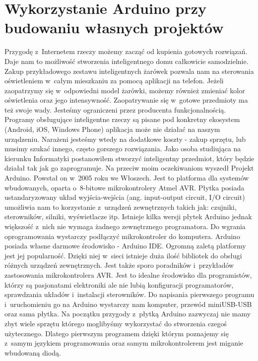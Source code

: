 \documentclass{xmgr}
\begin{document}
\section{Wykorzystanie Arduino przy budowaniu własnych projektów}

	Przygodę z~Internetem rzeczy możemy zacząć od kupienia gotowych rozwiązań. Daje nam to możliwość stworzenia inteligentnego domu całkowicie samodzielnie. Zakup przykładowego zestawu inteligentnych żarówek pozwala nam na sterowania oświetleniem w~całym mieszkaniu za pomocą aplikacji na telefon. Jeżeli zaopatrzymy się w~odpowiedni model żarówki, możemy również zmieniać kolor oświetlenia oraz jego intensywność. 
	Zaopatrywanie się w~gotowe przedmioty ma też swoje wady. Jesteśmy ograniczeni przez producenta funkcjonalnością. Programy obsługujące inteligentne rzeczy są pisane pod konkretny ekosystem (Android, iOS, Windows Phone) aplikacja może nie działać na naszym urządzeniu. Narażeni jesteśmy wtedy na dodatkowe koszty - zakup sprzętu, lub musimy szukać innego, często gorszego rozwiązania. Jako osoba studiująca na kierunku Informatyki postanowiłem stworzyć inteligentny przedmiot, który będzie działał tak jak go zaprogramuje. 
	Na przeciw moim oczekiwaniom wyszedł Projekt Arduino. Powstał on w~2005 roku we Włoszech. Jest to platforma dla systemów wbudowanych, oparta o~8-bitowe mikrokontrolery Atmel AVR. Płytka posiada ustandaryzowany układ wyjścia-wejścia (ang. input-output circuit, I/O circuit) umożliwia nam  to korzystanie z~urządzeń zewnętrznych takich jak: czujniki, sterowników, silniki, wyświetlacze itp. Istnieje kilka wersji płytek Arduino jednak większość z~nich nie wymaga żadnego zewnętrznego programatora. Do wgrania oprogramowania wystarczy podłączyć mikrokontroler do komputera. Arduino posiada własne darmowe środowisko - Arduino IDE. Ogromną zaletą platformy jest jej popularność. Dzięki niej w~sieci istnieje duża ilość bibliotek do obsługi różnych urządzeń zewnętrznych. Jest także sporo poradników i~przykładów zastosowania mikrokontrolera AVR.
	Jest to idealne środowisko dla programistów, którzy są pasjonatami elektroniki ale nie lubią konfiguracji programatorów, sprawdzania układów i~instalacji sterowników. Do napisania pierwszego programu i~uruchomieniu go na Arduino wystarczy nam komputer, przewód miniUSB-USB oraz sama płytka. 
	Na początku przygody z~płytką Arduino zazwyczaj nie mamy zbyt wiele sprzętu którego moglibyśmy wykorzystać do stworzenia czegoś użytecznego. Dlatego pierwszym programem dzięki którym poznajemy się z~samym językiem programowania oraz samym mikrokontrolerem jest miganie wbudowaną diodą.
\end{document}
